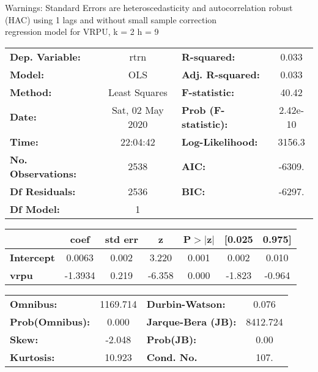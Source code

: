 Warnings: \newline
 [1] Standard Errors are heteroscedasticity and autocorrelation robust (HAC) using 1 lags and without small sample correction\\ 

regression model for VRPU, k = 2 h = 9\begin{center}
\begin{tabular}{lclc}
\toprule
\textbf{Dep. Variable:}    &       rtrn       & \textbf{  R-squared:         } &     0.033   \\
\textbf{Model:}            &       OLS        & \textbf{  Adj. R-squared:    } &     0.033   \\
\textbf{Method:}           &  Least Squares   & \textbf{  F-statistic:       } &     40.42   \\
\textbf{Date:}             & Sat, 02 May 2020 & \textbf{  Prob (F-statistic):} &  2.42e-10   \\
\textbf{Time:}             &     22:04:42     & \textbf{  Log-Likelihood:    } &    3156.3   \\
\textbf{No. Observations:} &        2538      & \textbf{  AIC:               } &    -6309.   \\
\textbf{Df Residuals:}     &        2536      & \textbf{  BIC:               } &    -6297.   \\
\textbf{Df Model:}         &           1      & \textbf{                     } &             \\
\bottomrule
\end{tabular}
\begin{tabular}{lcccccc}
                   & \textbf{coef} & \textbf{std err} & \textbf{z} & \textbf{P$> |$z$|$} & \textbf{[0.025} & \textbf{0.975]}  \\
\midrule
\textbf{Intercept} &       0.0063  &        0.002     &     3.220  &         0.001        &        0.002    &        0.010     \\
\textbf{vrpu}      &      -1.3934  &        0.219     &    -6.358  &         0.000        &       -1.823    &       -0.964     \\
\bottomrule
\end{tabular}
\begin{tabular}{lclc}
\textbf{Omnibus:}       & 1169.714 & \textbf{  Durbin-Watson:     } &    0.076  \\
\textbf{Prob(Omnibus):} &   0.000  & \textbf{  Jarque-Bera (JB):  } & 8412.724  \\
\textbf{Skew:}          &  -2.048  & \textbf{  Prob(JB):          } &     0.00  \\
\textbf{Kurtosis:}      &  10.923  & \textbf{  Cond. No.          } &     107.  \\
\bottomrule
\end{tabular}
\end{center}

